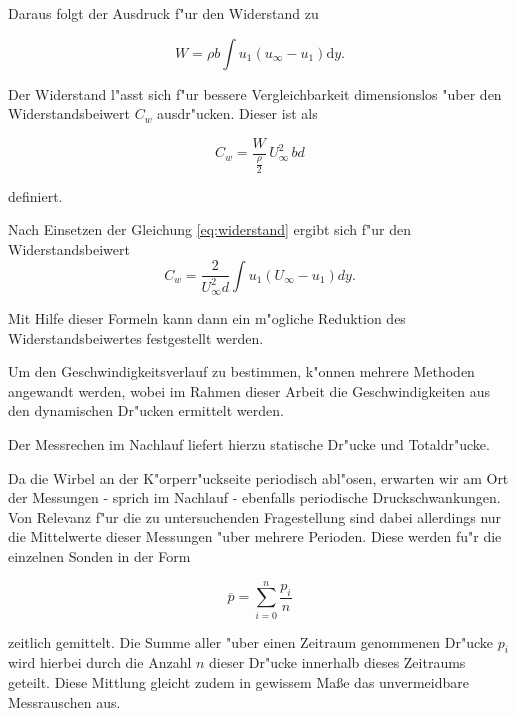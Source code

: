Daraus folgt der Ausdruck f"ur den Widerstand zu
\begin{center}
	\begin{equation}
		\label{eq:widerstand}
		W = \rho b \int u_{1} (u_{\infty}- u_{1}) \mathrm{d}y.
	\end{equation}
\end{center}

Der Widerstand l"asst sich f"ur bessere Vergleichbarkeit dimensionslos "uber den Widerstandsbeiwert $C_w$ ausdr"ucken. Dieser ist als 
\begin{center}
	\begin{equation}
		\label{eq:def-c_w}
		C_w = \frac{W}{\frac{\rho}{2}}\, U_{\infty}^2 \, bd
	\end{equation}
\end{center}
definiert.

Nach Einsetzen der Gleichung \ref{eq:widerstand} ergibt sich f"ur den Widerstandsbeiwert
\begin{equation}
	\label{eq:Bestimmungsgleichung C_w}
	C_w = \frac{2}{U_{\infty}^2 d} \int u_{1}(U_{\infty} - u_{1}) dy.
\end{equation}

Mit Hilfe dieser Formeln kann dann ein m"ogliche Reduktion des Widerstandsbeiwertes festgestellt werden.

Um den Geschwindigkeitsverlauf zu bestimmen, k"onnen mehrere Methoden angewandt werden, wobei im Rahmen dieser Arbeit die Geschwindigkeiten aus den dynamischen Dr"ucken ermittelt werden.

Der Messrechen im Nachlauf liefert hierzu statische Dr"ucke und Totaldr"ucke.

Da die Wirbel an der K"orperr"uckseite periodisch abl"osen, erwarten wir am Ort der Messungen - sprich im Nachlauf - ebenfalls periodische Druckschwankungen.
Von Relevanz f"ur die zu untersuchenden Fragestellung sind dabei allerdings nur die Mittelwerte dieser Messungen "uber mehrere Perioden.
Diese werden fu"r die einzelnen Sonden in der Form
\begin{center}	
	\begin{equation}
		\overline{p}=\sum_{i=0}^{n}\frac{p_i}{n}
	\end{equation}
\end{center}
zeitlich gemittelt.
Die Summe aller "uber einen Zeitraum genommenen Dr"ucke $p_i$ wird hierbei durch die Anzahl $n$ dieser Dr"ucke innerhalb dieses Zeitraums geteilt.
Diese Mittlung gleicht zudem in gewissem Ma\ss{}e das unvermeidbare Messrauschen aus.

